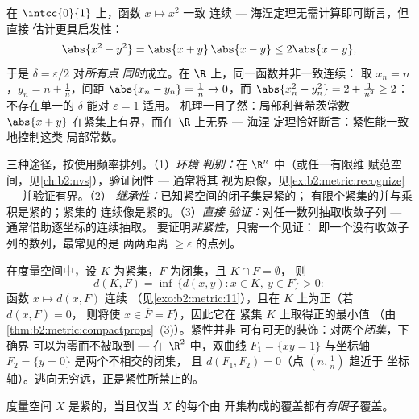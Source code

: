 \begin{example}\label{ex:b2:metric:heinework}
在 $\intcc{0}{1}$ 上，函数 $x \mapsto x^2$ 一致
连续 --- 海涅定理无需计算即可断言，但直接
估计更具启发性：
\[
\abs{x^2 - y^2} = \abs{x + y}\,\abs{x - y} \leq 2\abs{x - y},
\]
于是 $\delta = \varepsilon/2$ 对\emph{所有点
同时}成立。在 $\R$ 上，同一函数并非一致连续：
取 $x_n = n$，$y_n = n + \frac1n$，间距 $\abs{x_n - y_n}
= \frac1n \to 0$，而 $\abs{x_n^2 - y_n^2} = 2 + \frac1{n^2}
\geq 2$：不存在单一的 $\delta$ 能对 $\varepsilon = 1$ 适用。
机理一目了然：局部利普希茨常数 $\abs{x + y}$
在紧集上有界，而在 $\R$ 上无界 --- 海涅
定理恰好断言：紧性能一致地控制这类
局部常数。
\end{example}

\begin{method}[证明一个集合是紧的]\label{met:b2:metric:compactness}
三种途径，按使用频率排列。（1）\emph{环境
判别：}在 $\R^n$ 中（或任一有限维
赋范空间，见\cref{ch:b2:nvs}），验证闭性 --- 通常将其
视为原像，见\cref{ex:b2:metric:recognize} --- 并验证有界。（2）
\emph{继承性：}已知紧空间的闭子集是紧的；
有限个紧集的并与乘积是紧的；紧集的
连续像是紧的。（3）\emph{直接
验证：}对任一数列抽取收敛子列 ---
通常借助逐坐标的连续抽取。
要证明\emph{非紧性}，只需一个见证：
即一个没有收敛子列的数列，最常见的是
两两距离 $\geq \varepsilon$ 的点列。
\end{method}

\begin{example}\label{ex:b2:metric:setdistance}
在度量空间中，设 $K$ 为紧集，$F$ 为闭集，且 $K \cap F = \emptyset$，
则
\[
d(K, F) = \inf\,\{d(x, y) : x \in K,\ y \in F\} > 0 :
\]
函数 $x \mapsto d(x, F)$ 连续
（见\cref{exo:b2:metric:11}），且在 $K$ 上为正（若 $d(x, F) = 0$，
则将使 $x \in \overline F = F$），因此它在
紧集 $K$ 上取得正的最小值
（由\cref{thm:b2:metric:compactprops}~(3)）。紧性并非
可有可无的装饰：对两个\emph{闭集}，下确界
可以为零而不被取到 --- 在 $\R^2$ 中，双曲线 $F_1 = \{xy
= 1\}$ 与坐标轴 $F_2 = \{y = 0\}$ 是两个不相交的闭集，
且 $d(F_1, F_2) = 0$（点 $(n, \frac1n)$ 趋近于
坐标轴）。逃向无穷远，正是紧性所禁止的。
\end{example}

\begin{theorem}\label{thm:b2:metric:borellebesgue}
度量空间 $X$ 是紧的，当且仅当 $X$ 的每个由
开集构成的覆盖都有\emph{有限}子覆盖。
\end{theorem}

